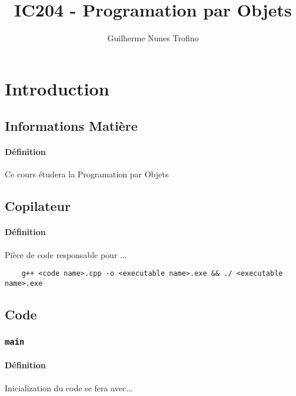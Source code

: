 \documentclass{article}
\title{IC204 - Programation par Objets}
\author{Guilherme Nunes Trofino}
\begin{document}
\maketitle

\newpage\tableofcontents

\section{Introduction}



\subsection{Informations Matière}
\paragraph{Définition}Ce cours étudera la Programation par Objets

\subsection{Copilateur}
\paragraph{Définition}Pièce de code responsable pour ...
\begin{scriptsize}
    \myStyleCPP
    \begin{lstlisting}
    g++ <code name>.cpp -o <executable name>.exe && ./ <executable name>.exe
    \end{lstlisting}
\end{scriptsize}

\subsection{Code}
\subsubsection{\texttt{main}}
\paragraph{Définition}Inicialization du code se fera avec...
\begin{scriptsize}
    \myStyleCPP
    
\end{scriptsize}
\end{document}
